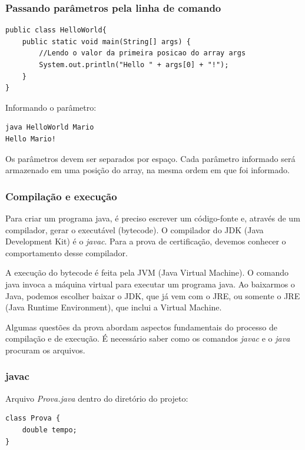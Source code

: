 \documentclass[12pt]{article}
\begin{document}
\subsubsection{Passando parâmetros pela linha de comando}

\begin{lstlisting}
public class HelloWorld{
	public static void main(String[] args) {
		//Lendo o valor da primeira posicao do array args
		System.out.println("Hello " + args[0] + "!");
	}
}	
\end{lstlisting}

Informando o parâmetro:

\begin{lstlisting}
java HelloWorld Mario
Hello Mario!
\end{lstlisting}

Os parâmetros devem ser separados por espaço. Cada parâmetro informado será armazenado em uma posição do array, na mesma ordem em que foi informado.

\subsubsection{Compilação e execução}

Para criar um programa java, é preciso escrever um código-fonte e, através de um compilador, gerar o executável (bytecode). O compilador do JDK (Java Development Kit) é o \textit{javac}. Para a prova de certificação, devemos conhecer o comportamento desse compilador.

A execução do bytecode é feita pela JVM (Java Virtual Machine). O comando java invoca a máquina virtual para executar um programa java. Ao baixarmos o Java, podemos escolher baixar o JDK, que já vem com o JRE, ou somente o JRE (Java Runtime Environment), que inclui a Virtual Machine.

Algumas questões da prova abordam aspectos fundamentais do processo de compilação e de execução. É necessário saber como os comandos \textit{javac} e o \textit{java} procuram os arquivos.

\subsubsection{javac}

Arquivo \textit{Prova.java} dentro do diretório do projeto:

\begin{lstlisting}
class Prova {
	double tempo;
}
\end{lstlisting}
\end{document}
